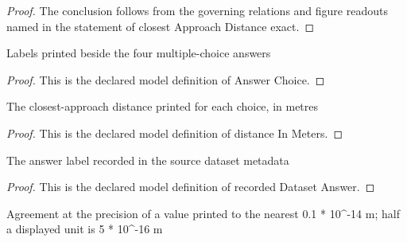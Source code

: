 \begin{proof}
  The conclusion follows from the governing relations and figure readouts named in the statement of closest Approach Distance exact.
\end{proof}
\begin{definition}
  \label{def:physics:phyx-mini-0635:phyxminiproblems-problemphyxmini0635-answerchoice}
  Labels printed beside the four multiple-choice answers
\end{definition}
\begin{proof}
  This is the declared model definition of Answer Choice.
\end{proof}
\begin{definition}
  \label{def:physics:phyx-mini-0635:phyxminiproblems-problemphyxmini0635-answerchoice-distanceinmeters}
  The closest-approach distance printed for each choice, in metres
\end{definition}
\begin{proof}
  This is the declared model definition of distance In Meters.
\end{proof}
\begin{definition}
  \label{def:physics:phyx-mini-0635:phyxminiproblems-problemphyxmini0635-recordeddatasetanswer}
  The answer label recorded in the source dataset metadata
\end{definition}
\begin{proof}
  This is the declared model definition of recorded Dataset Answer.
\end{proof}
\begin{definition}
  \label{def:physics:phyx-mini-0635:phyxminiproblems-problemphyxmini0635-matchesdisplayedclosestapproach}
  Agreement at the precision of a value printed to the nearest 0.1 * 10\textasciicircum{}-14 m; half a displayed unit is 5 * 10\textasciicircum{}-16 m
\end{definition}
